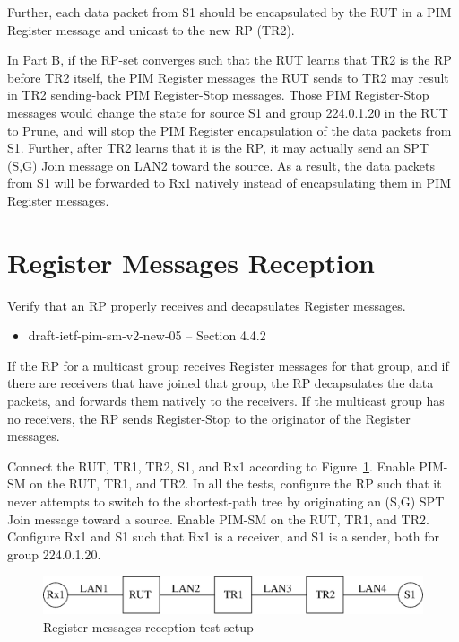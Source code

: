 \documentclass[11pt]{report}
\begin{document}
\begin{itemize}
  Further, each data packet from S1 should be encapsulated by the RUT in a PIM
  Register message and unicast to the new RP (TR2).

\end{itemize}


In Part B, if the RP-set converges such that the RUT learns that TR2 is the RP
before TR2 itself, the PIM Register messages the RUT sends to TR2 may result
in TR2 sending-back PIM Register-Stop messages. Those PIM Register-Stop
messages would change the state for source S1 and group 224.0.1.20 in the RUT
to Prune, and will stop the PIM Register encapsulation of the data packets
from S1. Further, after TR2 learns that it is the RP, it may actually send an
SPT (S,G) Join message on LAN2 toward the source. As a result, the data
packets from S1 will be forwarded to Rx1 natively instead of encapsulating
them in PIM Register messages.

\newpage
\section{Register Messages Reception}

Verify that an RP properly receives and decapsulates Register messages.

\begin{itemize}
  \item draft-ietf-pim-sm-v2-new-05 -- Section 4.4.2
\end{itemize}

If the RP for a multicast group receives Register messages for that group,
and if there are receivers that have joined that group, the RP decapsulates
the data packets, and forwards them natively to the receivers. If the
multicast group has no receivers, the RP sends Register-Stop to the originator
of the Register messages.

Connect the RUT, TR1, TR2, S1, and Rx1 according to
Figure~\ref{fig:pim_test_3_3_register_messages_reception}.
Enable PIM-SM on the RUT,
TR1, and TR2. In all the tests, configure the RP such that it never attempts to
switch to the shortest-path tree by originating an (S,G) SPT Join message
toward a source. Enable PIM-SM on the RUT, TR1, and TR2.  Configure Rx1 and S1
such that Rx1 is a receiver, and S1 is a sender, both for group 224.0.1.20.


\begin{figure}[htbp]
  \begin{center}
    \includegraphics[scale=0.8]{figs/pim_test_3_3_register_messages_reception}
    \caption{Register messages reception test setup}
    \label{fig:pim_test_3_3_register_messages_reception}
  \end{center}
\end{figure}
\end{document}
